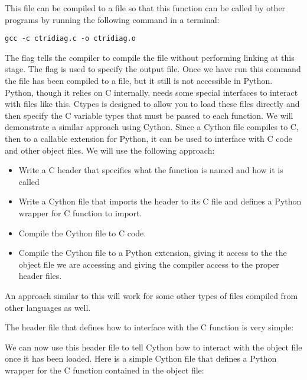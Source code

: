 This file can be compiled to a  file so that this function can be called by other programs by running the following command in a terminal:
\begin{lstlisting}[style=ShellInput]
gcc -c ctridiag.c -o ctridiag.o
\end{lstlisting}
The  flag tells the compiler to compile the file without performing linking at this stage.
The  flag is used to specify the output file.
Once we have run this command the file has been compiled to a  file, but it still is not accessible in Python.
Python, though it relies on C internally, needs some special interfaces to interact with  files like this.
Ctypes is designed to allow you to load these files directly and then specify the C variable types that must be passed to each function.
We will demonstrate a similar approach using Cython.
Since a Cython file compiles to C, then to a callable extension for Python, it can be used to interface with C code and other object files.
We will use the following approach:
\begin{itemize}

\item Write a C header that specifies what the function is named and how it is called

\item Write a Cython file that imports the header to its C file and defines a Python wrapper for C function to import.

\item Compile the Cython file to C code.

\item Compile the Cython file to a Python extension, giving it access to the the object file we are accessing and giving the compiler access to the proper header files.

\end{itemize}

An approach similar to this will work for some other types of  files compiled from other languages as well.

The header file that defines how to interface with the C function is very simple:



We can now use this header file to tell Cython how to interact with the object file once it has been loaded.
Here is a simple Cython file that defines a Python wrapper for the C function contained in the object file:

